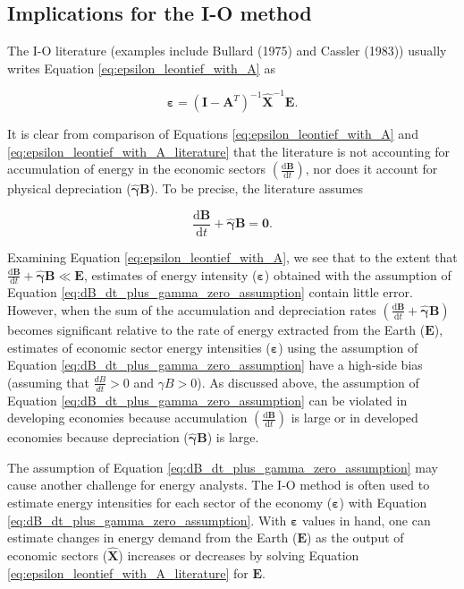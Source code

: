 \documentclass[authoryear,preprint,review,12pt]{elsarticle}
\let\oldhat\hat
\renewcommand{\vec}[1]{\mathbf{#1}}
\renewcommand{\hat}[1]{\oldhat{\mathbf{#1}}}
\begin{document}
\subsection{Implications for the I-O method}

The I-O literature (examples include Bullard (1975) and Cassler (1983)) usually writes Equation \ref{eq:epsilon_leontief_with_A} as

\begin{equation} \label{eq:epsilon_leontief_with_A_literature}
	\vec{\varepsilon} = (\vec{I} - \vec{A}^{T})^{-1}\hat{\vec{X}}^{-1}\vec{E}.
\end{equation}

\noindent It is clear from comparison of Equations \ref{eq:epsilon_leontief_with_A} and \ref{eq:epsilon_leontief_with_A_literature} that the literature is not accounting for accumulation of energy in the economic sectors $\left(\frac{\mathrm{d}\vec{B}}{\mathrm{d}t}\right)$, nor does it account for physical depreciation ($\hat{\vec{\gamma}}\vec{B}$). To be precise, the literature assumes

\begin{equation} \label{eq:dB_dt_plus_gamma_zero_assumption}
	\frac{\mathrm{d}\vec{B}}{\mathrm{d}t} + \hat{\vec{\gamma}}\vec{B} = \vec{0}.
\end{equation}

Examining Equation \ref{eq:epsilon_leontief_with_A}, we see that to the extent that $\frac{\mathrm{d}\vec{B}}{\mathrm{d}t} + \hat{\vec{\gamma}}\vec{B} \ll \vec{E}$, estimates of energy intensity ($\vec{\varepsilon}$) obtained with the assumption of Equation \ref{eq:dB_dt_plus_gamma_zero_assumption} contain little error. However, when the sum of the accumulation and depreciation rates $\left(\frac{\mathrm{d}\vec{B}}{\mathrm{d}t} + \hat{\vec{\gamma}}\vec{B}\right)$ becomes significant relative to the rate of energy extracted from the Earth ($\vec{E}$), estimates of economic sector energy intensities ($\vec{\varepsilon}$) using the assumption of Equation \ref{eq:dB_dt_plus_gamma_zero_assumption} have a high-side bias (assuming that $\frac{dB}{dt} >0$ and $\gamma B > 0$). As discussed above, the assumption of Equation \ref{eq:dB_dt_plus_gamma_zero_assumption} can be violated in developing economies because accumulation $\left(\frac{\mathrm{d}\vec{B}}{\mathrm{d}t}\right)$ is large or in developed economies because depreciation ($\hat{\gamma}\vec{B}$) is large. 

The assumption of Equation \ref{eq:dB_dt_plus_gamma_zero_assumption} may cause another challenge for energy analysts. The I-O method is often used to estimate energy intensities for each sector of the economy ($\vec{\varepsilon}$) with Equation \ref{eq:dB_dt_plus_gamma_zero_assumption}. With $\vec{\varepsilon}$ values in hand, one can estimate changes in energy demand from the Earth ($\vec{E}$) as the output of economic sectors ($\hat{\vec{X}}$) increases or decreases by solving Equation \ref{eq:epsilon_leontief_with_A_literature} for $\vec{E}$.
\end{document}
